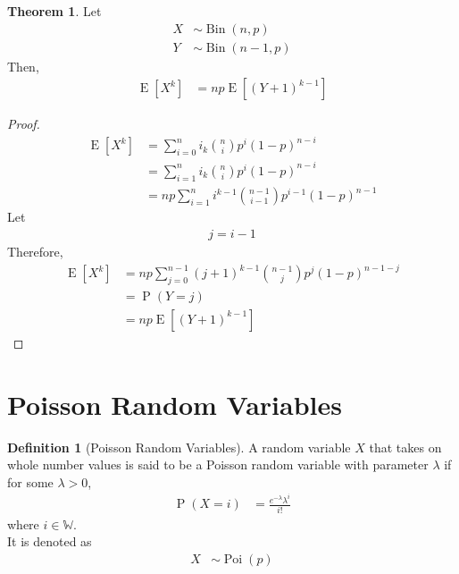 \documentclass[titlepage, fleqn, a4paper, 12pt, twoside]{article}
\theoremstyle{definition}
\newtheorem{definition}{Definition}
\theoremstyle{theorem}
\newtheorem{theorem}{Theorem}
\DeclareMathOperator{\prob}{\mathrm{P}}
\DeclareMathOperator{\expct}{\mathrm{E}}
\DeclareMathOperator{\bin}{\mathrm{Bin}}
\DeclareMathOperator{\poi}{\mathrm{Poi}}
\begin{document}
\begin{theorem}
	Let
	\begin{align*}
		X & \sim \bin(n,p) \\
		Y & \sim \bin(n - 1,p)
	\end{align*}
	Then,
	\begin{align*}
		\expct\left[ X^k \right] & = n p \expct\left[ (Y + 1)^{k - 1} \right]
	\end{align*}
\end{theorem}

\begin{proof}
	\begin{align*}
		\expct\left[ X^k \right] & = \sum\limits_{i = 0}^{n} i_k \binom{n}{i} p^i (1 - p)^{n - i} \\
                                         & = \sum\limits_{i = 1}^{n} i_k \binom{n}{i} p^i (1 - p)^{n - i} \\
                                         & = n p \sum\limits_{i = 1}^{n} i^{k - 1} \binom{n - 1}{i - 1} p^{i - 1} (1 - p)^{n - 1}
	\end{align*}
	Let
	\begin{align*}
		j = i - 1
	\end{align*}
	Therefore,
	\begin{align*}
		\expct\left[ X^k \right] & = n p \sum\limits_{j = 0}^{n - 1} (j + 1)^{k - 1} \binom{n - 1}{j} p^j (1 - p)^{n - 1 - j} \\
                                         & = \prob(Y = j)                                                                            \\
                                         & = n p \expct\left[ (Y + 1)^{k - 1} \right]
	\end{align*}
\end{proof}

\section{Poisson Random Variables}

\begin{definition}[Poisson Random Variables]
	A random variable $X$ that takes on whole number values is said to be a Poisson random variable with parameter $\lambda$ if for some $\lambda > 0$,
	\begin{align*}
		\prob(X = i) & = \frac{e^{-\lambda} \lambda^i}{i!}
	\end{align*}
	where $i \in \mathbb{W}$.\\
	It is denoted as
	\begin{align*}
		X & \sim \poi(p)
	\end{align*}
\end{definition}
\end{document}
